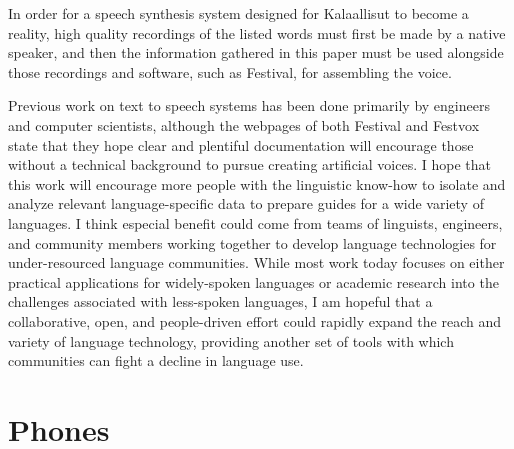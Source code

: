 \documentclass[12pt]{article}
\begin{document}
In order for a speech synthesis system designed for Kalaallisut to become a reality, high quality recordings of the listed words must first be made by a native speaker, and then the information gathered in this paper must be used alongside those recordings and software, such as Festival, for assembling the voice. \par

Previous work on text to speech systems has been done primarily by engineers and computer scientists, although the webpages of both Festival and Festvox state that they hope clear and plentiful documentation will encourage those without a technical background to pursue creating artificial voices. I hope that this work will encourage more people with the linguistic know-how to isolate and analyze relevant language-specific data to prepare guides for a wide variety of languages. I think especial benefit could come from teams of linguists, engineers, and community members working together to develop language technologies for under-resourced language communities. While most work today focuses on either practical applications for widely-spoken languages or academic research into the challenges associated with less-spoken languages, I am hopeful that a collaborative, open, and people-driven effort could rapidly expand the reach and variety of language technology, providing another set of tools with which communities can fight a decline in language use. \par

\newpage

\appendix
\section{Phones}
\end{document}
